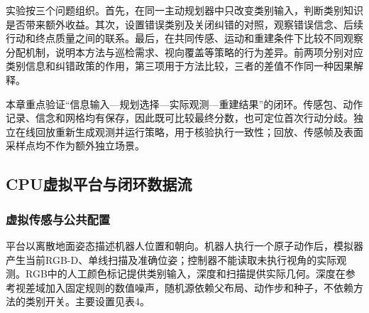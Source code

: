 \documentclass[11pt,a4paper]{article}
\begin{document}
实验按三个问题组织。首先，在同一主动规划器中只改变类别输入，判断类别知识是否带来额外收益。其次，设置错误类别及关闭纠错的对照，观察错误信念、后续行动和终点质量之间的联系。最后，在共同传感、运动和重建条件下比较不同观察分配机制，说明本方法与巡检需求、视向覆盖等策略的行为差异。前两项分别对应类别信息和纠错政策的作用，第三项用于方法比较，三者的差值不作同一种因果解释。

本章重点验证``信息输入---规划选择---实际观测---重建结果''的闭环。传感包、动作记录、信念和网格均有保存，因此既可比较最终分数，也可定位首次行动分歧。独立在线回放重新生成观测并运行策略，用于核验执行一致性；回放、传感帧及表面采样点均不作为额外独立场景。

\hypertarget{cpuux865aux62dfux5e73ux53f0ux4e0eux95edux73afux6570ux636eux6d41}{%
\subsection{CPU虚拟平台与闭环数据流}\label{cpuux865aux62dfux5e73ux53f0ux4e0eux95edux73afux6570ux636eux6d41}}

\hypertarget{ux865aux62dfux4f20ux611fux4e0eux516cux5171ux914dux7f6e}{%
\subsubsection{虚拟传感与公共配置}\label{ux865aux62dfux4f20ux611fux4e0eux516cux5171ux914dux7f6e}}

平台以离散地面姿态描述机器人位置和朝向。机器人执行一个原子动作后，模拟器产生当前RGB-D、单线扫描及准确位姿；控制器不能读取未执行视角的实际观测。RGB中的人工颜色标记提供类别输入，深度和扫描提供实际几何。深度在参考视差域加入固定规则的数值噪声，随机源依赖父布局、动作步和种子，不依赖方法的类别开关。主要设置见表4。
\end{document}
